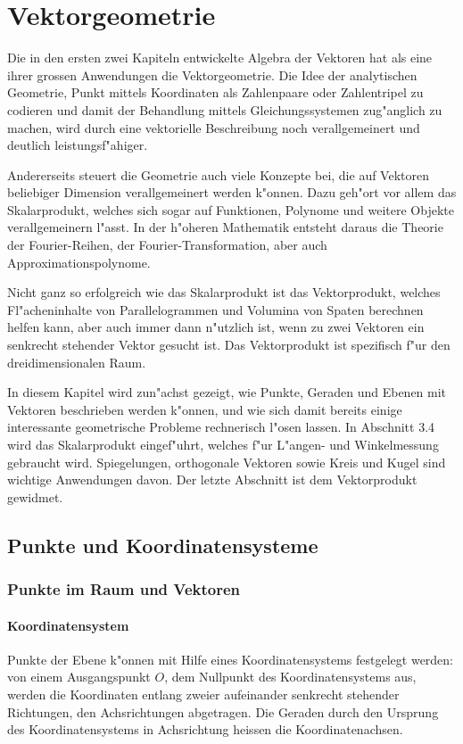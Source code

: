 \chapter{Vektorgeometrie\label{chapter-vektorgeometrie}}
Die in den ersten zwei Kapiteln entwickelte Algebra der Vektoren 
hat als eine ihrer grossen Anwendungen die Vektorgeometrie. Die
Idee der analytischen Geometrie, Punkt mittels Koordinaten als Zahlenpaare
oder Zahlentripel zu codieren und damit der Behandlung mittels
Gleichungssystemen zug"anglich zu machen, wird durch eine
vektorielle Beschreibung noch verallgemeinert und deutlich leistungsf"ahiger.

Andererseits steuert die Geometrie auch viele Konzepte bei, die auf
Vektoren beliebiger Dimension verallgemeinert werden k"onnen. Dazu
geh"ort vor allem das Skalarprodukt, welches sich sogar auf
Funktionen, Polynome und weitere Objekte verallgemeinern l"asst.
In der h"oheren Mathematik entsteht daraus die Theorie der Fourier-Reihen,
der Fourier-Transformation, aber auch Approximationspolynome.

Nicht ganz so erfolgreich wie das Skalarprodukt ist das Vektorprodukt,
welches Fl"acheninhalte von Parallelogrammen und Volumina von Spaten
berechnen helfen kann, aber auch immer dann n"utzlich ist, wenn
zu zwei Vektoren ein senkrecht stehender Vektor gesucht ist. Das
Vektorprodukt ist spezifisch f"ur den dreidimensionalen Raum.

In diesem Kapitel wird zun"achst gezeigt, wie Punkte, Geraden und
Ebenen mit Vektoren beschrieben werden k"onnen, und wie sich damit
bereits einige interessante geometrische Probleme rechnerisch l"osen
lassen. In Abschnitt 3.4 wird das Skalarprodukt eingef"uhrt, welches
f"ur L"angen- und Winkelmessung gebraucht wird. Spiegelungen, orthogonale
Vektoren sowie Kreis und Kugel sind wichtige Anwendungen davon.
Der letzte Abschnitt ist dem Vektorprodukt gewidmet.

\section{Punkte und Koordinatensysteme}
\subsection{Punkte im Raum und Vektoren}
\subsubsection{Koordinatensystem}
Punkte der Ebene k"onnen mit Hilfe eines Koordinatensystems festgelegt
werden: von einem Ausgangspunkt $O$, dem Nullpunkt des Koordinatensystems
aus, werden die Koordinaten entlang zweier aufeinander senkrecht stehender
Richtungen, den Achsrichtungen abgetragen. Die Geraden durch den Ursprung
des Koordinatensystems in Achsrichtung heissen die Koordinatenachsen.

